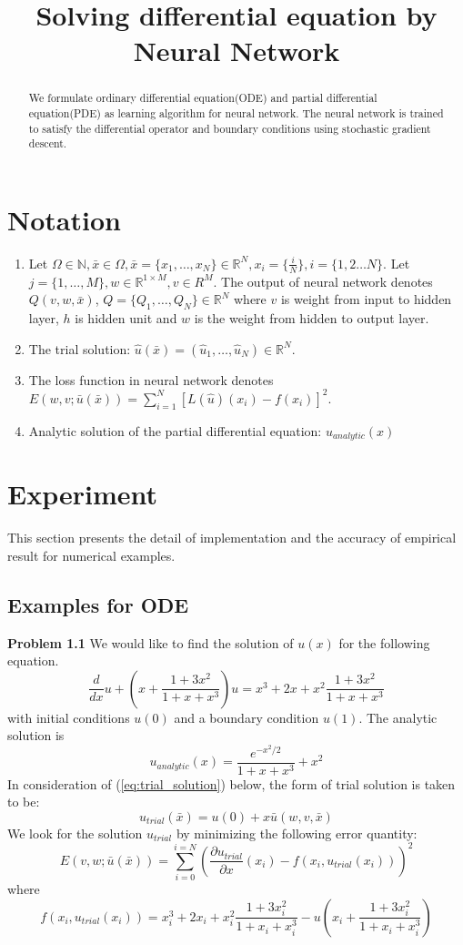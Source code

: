 \documentclass{article}
\begin{document}
	\title{Solving differential equation by Neural Network}
	\maketitle
	\begin{abstract}
	We formulate ordinary differential equation(ODE) and partial differential equation(PDE) as learning algorithm for neural network. The neural network is trained to satisfy the differential operator and boundary conditions using stochastic gradient descent.
	\end{abstract}


\tableofcontents

\section{Notation}
\begin{enumerate}
	\item Let $\Omega \in \mathbb{N}, \bar{x} \in \Omega, \bar{x}=\{x_1, \dots, x_N\} \in \mathbb{R}^{N}, x_i=\{\frac{i}{N} \}, i=\{1,2 \dots N\}$. Let $j=\{1, \dots, M\}, w \in \mathbb{R}^{1 \times M}, v \in R^{M}$. The output of neural network denotes $Q(v,w,\bar{x})$, $Q=\{Q_1, \dots, Q_N\} \in \mathbb{R}^N$ where $v$ is weight from input to hidden layer, $h$ is hidden unit and $w$ is the weight from hidden to output layer.
	\item The trial solution: $\hat{u}(\bar{x}) = (\hat{u}_{1}, \dots , \hat{u}_{N}) \in \mathbb{R}^{N}$.
	\item The loss function in neural network denotes $E(w,v;\bar{u}(\bar{x})) = \sum_{i=1}^{N}[L(\hat{u})(x_i) - f(x_i)]^{2}$.
	\item Analytic solution of the partial differential equation: $u_{analytic}(x)$

\end{enumerate}
\section{Experiment}
This section presents the detail of implementation and the accuracy of empirical result for numerical examples.

\subsection{Examples for ODE}
\textbf{Problem 1.1}
We would like to find the solution of $u(x)$ for the following equation.
\[\frac{d}{dx}u + \left(x+\frac{1+3x^2}{1+x+x^3}\right)u = x^3 +2x +x^{2}\frac{1+3x^2}{1+x+x^3}\]
with initial conditions $u(0)$ and a boundary condition $u(1)$.
The analytic solution is
\[u_{analytic}(x)=\frac{e ^{-x^2/2}}{1+x+x^3} + x^2\]
In consideration of (\ref{eq:trial_solution}) below, the form of trial solution is taken to be:
\[u_{trial}(\bar{x}) = u(0) + x\bar{u}(w,v,\bar{x})\] 
We look for the solution $u_{trial}$ by minimizing the following error quantity:
\[E(v,w;\bar{u}(\bar{x})) =  \sum_{i=0}^{i=N} \left( \frac{\partial u_{trial} }{\partial x}(x_i)-f(x_i,u_{trial}(x_i))\right)^2\]
where
\[f(x_i,u_{trial}(x_i)) =x_{i}^3 +2x_{i} +x_{i}^{2}\frac{1+3x_{i}^2}{1+x_{i}+x_{i}^3} - u\left(x_{i}+\frac{1+3x_{i}^2}{1+x_{i}+x_{i}^3}\right)\]
\end{document}
